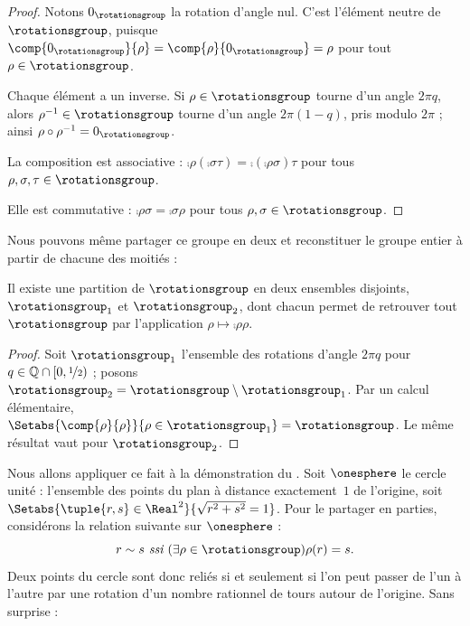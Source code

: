 \documentclass[../../../include/open-logic-section]{subfiles}
\begin{document}
\begin{proof}
Notons $0_{\rotationsgroup}$ la rotation
d'angle nul. C'est l'élément neutre
de $\rotationsgroup$, puisque
$\comp{0_{\rotationsgroup}}{\rho}
= \comp{\rho}{0_{\rotationsgroup}}
= \rho$ pour tout
$\rho \in \rotationsgroup$.

Chaque élément a un inverse. Si
$\rho \in \rotationsgroup$ tourne
d'un angle $2\pi q$, alors
$\rho^{-1} \in \rotationsgroup$
tourne d'un angle
$2\pi(1-q)$, pris modulo
$2\pi$ ; ainsi
$\rho \circ \rho^{-1}
= 0_\rotationsgroup$.

La composition est associative :
$\comp{\rho}{(\comp{\sigma}{\tau})}
= \comp{(\comp{\rho}{\sigma})}{\tau}$
pour tous
$\rho, \sigma, \tau \in
\rotationsgroup$.

Elle est commutative :
$\comp{\rho}{\sigma}
= \comp{\sigma}{\rho}$
pour tous
$\rho, \sigma \in \rotationsgroup$.
\end{proof}

Nous pouvons même partager ce groupe
en deux et reconstituer le groupe
entier à partir de chacune des moitiés :

\begin{lem}
Il existe une partition de
$\rotationsgroup$ en deux ensembles
disjoints, $\rotationsgroup_{1}$
et $\rotationsgroup_{2}$, dont chacun
permet de retrouver tout
$\rotationsgroup$ par l'application
$\rho\mapsto\comp{\rho}{\rho}$.
\end{lem}

\begin{proof}
Soit $\rotationsgroup_{1}$
l'ensemble des rotations d'angle
$2\pi q$ pour
$q\in\mathbb{Q}\cap[0,\nicefrac{1}{2})$ ;
posons
$\rotationsgroup_{2}
= \rotationsgroup\setminus
\rotationsgroup_1$.
Par un calcul élémentaire,
$\Setabs{\comp{\rho}{\rho}}
{\rho \in \rotationsgroup_1}
= \rotationsgroup$.
Le même résultat vaut pour
$\rotationsgroup_2$.
\end{proof}

Nous allons appliquer ce fait
à la démonstration du
.
Soit $\onesphere$ le cercle unité :
l'ensemble des points du plan à
distance exactement~$1$ de l'origine,
soit
$\Setabs{\tuple{r,s} \in \Real^2}
{\sqrt{r^2+s^2}=1}$.
Pour le partager en parties,
considérons la relation suivante
sur $\onesphere$ :
\[
	r \sim s \emph{ ssi }
	(\exists \rho \in \rotationsgroup)
	\rho(r) = s.
\]
Deux points du cercle sont donc
reliés si et seulement si l'on
peut passer de l'un à l'autre
par une rotation d'un nombre
rationnel de tours autour de
l'origine. Sans surprise :
\end{document}
